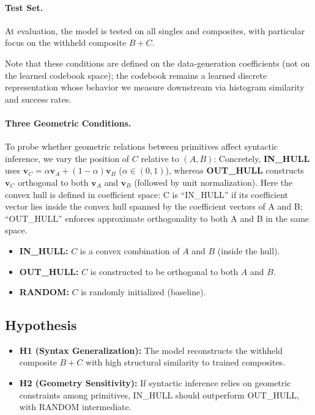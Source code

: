 \documentclass{article}
\begin{document}
\paragraph{Test Set.}
At evaluation, the model is tested on all singles and composites, with particular focus on the withheld composite $B{+}C$.


Note that these conditions are defined on the data-generation coefficients (not on the learned codebook space); the codebook remains a learned discrete representation whose behavior we measure downstream via histogram similarity and success rates.

\paragraph{Three Geometric Conditions.}
To probe whether geometric relations between primitives affect syntactic inference, we vary the position of $C$ relative to $(A, B)$:
Concretely, \textbf{IN\_HULL} uses $\mathbf{v}_C=\alpha \mathbf{v}_A+(1-\alpha)\mathbf{v}_B$ ($\alpha\in(0,1)$), whereas \textbf{OUT\_HULL} constructs $\mathbf{v}_C$ orthogonal to both $\mathbf{v}_A$ and $\mathbf{v}_B$ (followed by unit normalization). Here the convex hull is defined in coefficient space: C is “IN\_HULL” if its coefficient vector lies inside the convex hull spanned by the coefficient vectors of A and B; “OUT\_HULL” enforces approximate orthogonality to both A and B in the same space.
\begin{itemize}
    \item \textbf{IN\_HULL:} $C$ is a convex combination of $A$ and $B$ (inside the hull).
    \item \textbf{OUT\_HULL:} $C$ is constructed to be orthogonal to both $A$ and $B$.
    \item \textbf{RANDOM:} $C$ is randomly initialized (baseline).
\end{itemize}

\subsection{Hypothesis}
\begin{itemize}
    \item \textbf{H1 (Syntax Generalization):} The model reconstructs the withheld composite $B{+}C$ with high structural similarity to trained composites.
    \item \textbf{H2 (Geometry Sensitivity):} If syntactic inference relies on geometric constraints among primitives, IN\_HULL should outperform OUT\_HULL, with RANDOM intermediate.
\end{itemize}
\end{document}

